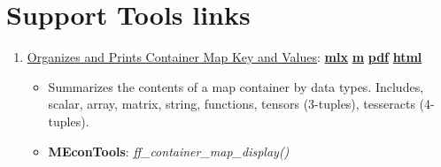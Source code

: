 \documentclass[
]{book}
\providecommand{\tightlist}{%
  \setlength{\itemsep}{0pt}\setlength{\parskip}{0pt}}
\begin{document}
\hypertarget{support-tools-links}{%
\section{Support Tools links}\label{support-tools-links}}

\begin{enumerate}
\def\labelenumi{\arabic{enumi}.}
\tightlist
\item
  \href{https://fanwangecon.github.io/MEconTools/MEconTools/doc/tools/htmlpdfm/fx_container_map_display.html}{Organizes and Prints Container Map Key and Values}: \href{https://github.com/FanWangEcon/MEconTools/blob/master/MEconTools/doc/tools/fx_container_map_display.mlx}{\textbf{mlx}} \textbar{} \href{https://github.com/FanWangEcon/MEconTools/blob/master/MEconTools/doc/tools/htmlpdfm/fx_container_map_display.m}{\textbf{m}} \textbar{} \href{https://github.com/FanWangEcon/MEconTools/blob/master/MEconTools/doc/tools/htmlpdfm/fx_container_map_display.pdf}{\textbf{pdf}} \textbar{} \href{https://fanwangecon.github.io/MEconTools/MEconTools/doc/tools/htmlpdfm/fx_container_map_display.html}{\textbf{html}}

  \begin{itemize}
  \tightlist
  \item
    Summarizes the contents of a map container by data types. Includes, scalar, array, matrix, string, functions, tensors (3-tuples), tesseracts (4-tuples).
  \item
    \textbf{MEconTools}: \emph{ff\_container\_map\_display()}
  \end{itemize}
\end{enumerate}

  
\end{document}
